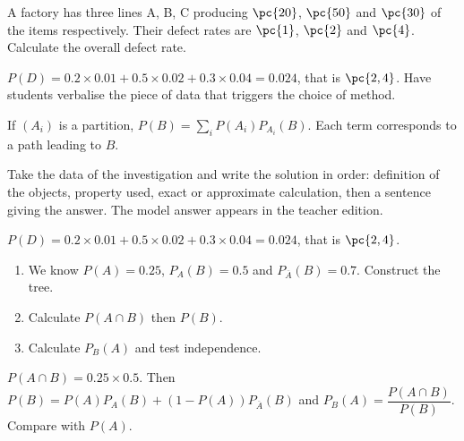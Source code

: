     \begin{activity}
    A factory has three lines A, B, C producing $\pc{20}$, $\pc{50}$ and $\pc{30}$ of the items respectively. Their defect rates are $\pc{1}$, $\pc{2}$ and $\pc{4}$. Calculate the overall defect rate.
    \begin{center}\end{center}
    \end{activity}
    \begin{solution}$P(D)=\num{0,2}\times\num{0,01}+\num{0,5}\times\num{0,02}+\num{0,3}\times\num{0,04}=\num{0,024}$, that is $\pc{2,4}$. Have students verbalise the piece of data that triggers the choice of method.\end{solution}

    \begin{summary}If $(A_i)$ is a partition, $P(B)=\sum_i P(A_i)P_{A_i}(B)$. Each term corresponds to a path leading to $B$.\end{summary}

    \begin{example}
    Take the data of the investigation and write the solution in order: definition of the objects, property used, exact or approximate calculation, then a sentence giving the answer. The model answer appears in the teacher edition.
    \end{example}
    \begin{solution}$P(D)=\num{0,2}\times\num{0,01}+\num{0,5}\times\num{0,02}+\num{0,3}\times\num{0,04}=\num{0,024}$, that is $\pc{2,4}$.\end{solution}

    \begin{exercise}[essential]
    \begin{enumerate}\item We know $P(A)=\num{0,25}$, $P_A(B)=\num{0,5}$ and $P_{\overline A}(B)=\num{0,7}$. Construct the tree.\item Calculate $P(A\cap B)$ then $P(B)$.\item Calculate $P_B(A)$ and test independence.\end{enumerate}
    \end{exercise}
    \begin{solution}$P(A\cap B)=\num{0,25}\times\num{0,5}$. Then $P(B)=P(A)P_A(B)+(1-P(A))P_{\overline A}(B)$ and $P_B(A)=\dfrac{P(A\cap B)}{P(B)}$. Compare with $P(A)$.\end{solution}

